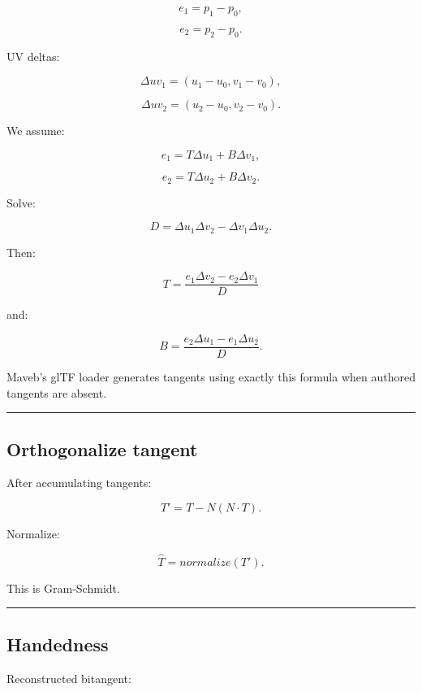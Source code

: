 \[
e_1=p_1-p_0,
\]

\[
e_2=p_2-p_0.
\]

UV deltas:

\[
\Delta uv_1=
(u_1-u_0,v_1-v_0),
\]

\[
\Delta uv_2=
(u_2-u_0,v_2-v_0).
\]

We assume:

\[
e_1=
T\Delta u_1+
B\Delta v_1,
\]

\[
e_2=
T\Delta u_2+
B\Delta v_2.
\]

Solve:

\[
D=
\Delta u_1\Delta v_2
-
\Delta v_1\Delta u_2.
\]

Then:

\[
\boxed{
T=
\frac{
e_1\Delta v_2-
e_2\Delta v_1
}{D}
}
\]

and:

\[
\boxed{
B=
\frac{
e_2\Delta u_1-
e_1\Delta u_2
}{D}.
}
\]

Maveb's glTF loader generates tangents using exactly this formula when authored tangents are absent.

\begin{center}\rule{0.5\linewidth}{0.5pt}\end{center}

\subsection{Orthogonalize tangent}\label{04-visual-computing-ii-ch041-orthogonalize-tangent}

\hypertarget{04-visual-computing-ii-ch041-orthogonalize-tangent}{}

After accumulating tangents:

\[
T'
=
T-N(N\cdot T).
\]

Normalize:

\[
\boxed{
\hat T=
normalize(T').
}
\]

This is Gram-Schmidt.

\begin{center}\rule{0.5\linewidth}{0.5pt}\end{center}

\subsection{Handedness}\label{04-visual-computing-ii-ch041-handedness}

\hypertarget{04-visual-computing-ii-ch041-handedness}{}

Reconstructed bitangent:

